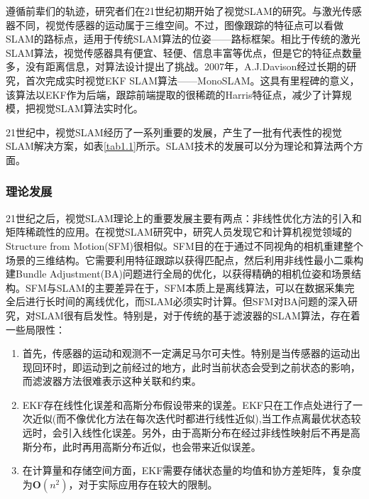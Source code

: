 遵循前辈们的轨迹，研究者们在21世纪初期开始了视觉SLAM的研究。与激光传感器不同，视觉传感器的运动属于三维空间。不过，图像跟踪的特征点可以看做SLAM的路标点，适用于传统SLAM算法的位姿——路标框架\upcite{[1.17]}。相比于传统的激光SLAM算法，视觉传感器具有便宜、轻便、信息丰富等优点，但是它的特征点数量多，没有距离信息，对算法设计提出了挑战。2007年，A.J.Davison经过长期的研究，首次完成实时视觉EKF SLAM算法——MonoSLAM\upcite{[1.2]}。这具有里程碑的意义，该算法以EKF作为后端，跟踪前端提取的很稀疏的Harris特征点\upcite{[1.18]}，减少了计算规模，把视觉SLAM算法实时化。

21世纪中，视觉SLAM经历了一系列重要的发展，产生了一批有代表性的视觉SLAM解决方案，如表\ref{tab1.1}所示。SLAM技术的发展可以分为理论和算法两个方面。

\subsubsection{理论发展}
21世纪之后，视觉SLAM理论上的重要发展主要有两点：非线性优化方法的引入和矩阵稀疏性的应用。在视觉SLAM研究中，研究人员发现它和计算机视觉领域的Structure from Motion(SFM)很相似。SFM目的在于通过不同视角的相机重建整个场景的三维结构。它需要利用特征跟踪以获得匹配点，然后利用非线性最小二乘构建Bundle Adjustment(BA)问题进行全局的优化，以获得精确的相机位姿和场景结构\upcite{[1.34]}。SFM与SLAM的主要差异在于，SFM本质上是离线算法，可以在数据采集完全后进行长时间的离线优化，而SLAM必须实时计算。但SFM对BA问题的深入研究\upcite{[1.35]}，对SLAM很有启发性。特别是，对于传统的基于滤波器的SLAM算法，存在着一些局限性：

\begin{enumerate}[label={(\arabic*)}]
\item 首先，传感器的运动和观测不一定满足马尔可夫性。特别是当传感器的运动出现回环时，即运动到之前经过的地方，此时当前状态会受到之前状态的影响，而滤波器方法很难表示这种关联和约束。
\item EKF存在线性化误差和高斯分布假设带来的误差。EKF只在工作点处进行了一次近似(而不像优化方法在每次迭代时都进行线性近似),当工作点离最优状态较远时，会引入线性化误差。另外，由于高斯分布在经过非线性映射后不再是高斯分布，此时再用高斯分布近似，也会带来近似误差。
\item 在计算量和存储空间方面，EKF需要存储状态量的均值和协方差矩阵，复杂度为$\boldsymbol{O}(n^2)$，对于实际应用存在较大的限制。
\end{enumerate}

